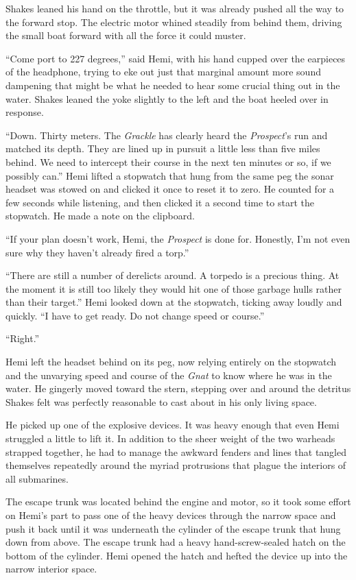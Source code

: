\documentclass[
]{scrbook}
\begin{document}
Shakes leaned his hand on the throttle, but it was already pushed all
the way to the forward stop. The electric motor whined steadily from
behind them, driving the small boat forward with all the force it could
muster.

``Come port to 227 degrees,'' said Hemi, with his hand cupped over the
earpieces of the headphone, trying to eke out just that marginal amount
more sound dampening that might be what he needed to hear some crucial
thing out in the water. Shakes leaned the yoke slightly to the left and
the boat heeled over in response.

``Down. Thirty meters. The \emph{Grackle} has clearly heard the
\emph{Prospect}'s run and matched its depth. They are lined up in
pursuit a little less than five miles behind. We need to intercept their
course in the next ten minutes or so, if we possibly can.'' Hemi lifted
a stopwatch that hung from the same peg the sonar headset was stowed on
and clicked it once to reset it to zero. He counted for a few seconds
while listening, and then clicked it a second time to start the
stopwatch. He made a note on the clipboard.

``If your plan doesn't work, Hemi, the \emph{Prospect} is done for.
Honestly, I'm not even sure why they haven't already fired a torp.''

``There are still a number of derelicts around. A torpedo is a precious
thing. At the moment it is still too likely they would hit one of those
garbage hulls rather than their target.'' Hemi looked down at the
stopwatch, ticking away loudly and quickly. ``I have to get ready. Do
not change speed or course.''

``Right.''

Hemi left the headset behind on its peg, now relying entirely on the
stopwatch and the unvarying speed and course of the \emph{Gnat} to know
where he was in the water. He gingerly moved toward the stern, stepping
over and around the detritus Shakes felt was perfectly reasonable to
cast about in his only living space.

He picked up one of the explosive devices. It was heavy enough that even
Hemi struggled a little to lift it. In addition to the sheer weight of
the two warheads strapped together, he had to manage the awkward fenders
and lines that tangled themselves repeatedly around the myriad
protrusions that plague the interiors of all submarines.

The escape trunk was located behind the engine and motor, so it took
some effort on Hemi's part to pass one of the heavy devices through the
narrow space and push it back until it was underneath the cylinder of
the escape trunk that hung down from above. The escape trunk had a heavy
hand-screw-sealed hatch on the bottom of the cylinder. Hemi opened the
hatch and hefted the device up into the narrow interior space.
\end{document}
